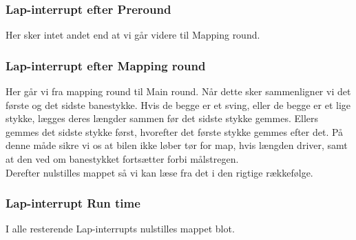 \subsubsection{Lap-interrupt efter Preround}

Her sker intet andet end at vi går videre til Mapping round.

\subsubsection{Lap-interrupt efter Mapping round}

Her går vi fra mapping round til Main round. Når dette sker sammenligner vi det første og det sidste banestykke. Hvis de begge er et sving, eller de begge er et lige stykke, lægges deres længder sammen før det sidste stykke gemmes. Ellers gemmes det sidste stykke først, hvorefter det første stykke gemmes efter det. På denne måde sikre vi os at bilen ikke løber tør for map, hvis længden driver, samt at den ved om banestykket fortsætter forbi målstregen.
\\
Derefter nulstilles mappet så vi kan læse fra det i den rigtige rækkefølge.

\subsubsection{Lap-interrupt Run time}

I alle resterende Lap-interrupts nulstilles mappet blot.

